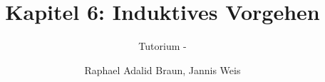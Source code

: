 \documentclass[18pt]{beamer}
\title[Aussagenlogik]{Kapitel 6: Induktives Vorgehen}
\subtitle{Tutorium - } %
\author{Raphael Adalid Braun, Jannis Weis}
\institute{Grundbegriffe der Informatik | WS 2018/19}
\begin{document}

\begin{frame}
	\titlepage
\end{frame}

\def\showSolutions{1}					 %

\title[Induktives Vorgehen]{}

\end{document}
